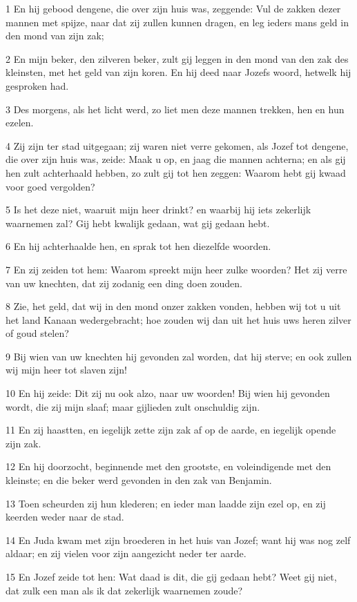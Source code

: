 \par 1 En hij gebood dengene, die over zijn huis was, zeggende: Vul de zakken dezer mannen met spijze, naar dat zij zullen kunnen dragen, en leg ieders mans geld in den mond van zijn zak;
\par 2 En mijn beker, den zilveren beker, zult gij leggen in den mond van den zak des kleinsten, met het geld van zijn koren. En hij deed naar Jozefs woord, hetwelk hij gesproken had.
\par 3 Des morgens, als het licht werd, zo liet men deze mannen trekken, hen en hun ezelen.
\par 4 Zij zijn ter stad uitgegaan; zij waren niet verre gekomen, als Jozef tot dengene, die over zijn huis was, zeide: Maak u op, en jaag die mannen achterna; en als gij hen zult achterhaald hebben, zo zult gij tot hen zeggen: Waarom hebt gij kwaad voor goed vergolden?
\par 5 Is het deze niet, waaruit mijn heer drinkt? en waarbij hij iets zekerlijk waarnemen zal? Gij hebt kwalijk gedaan, wat gij gedaan hebt.
\par 6 En hij achterhaalde hen, en sprak tot hen diezelfde woorden.
\par 7 En zij zeiden tot hem: Waarom spreekt mijn heer zulke woorden? Het zij verre van uw knechten, dat zij zodanig een ding doen zouden.
\par 8 Zie, het geld, dat wij in den mond onzer zakken vonden, hebben wij tot u uit het land Kanaan wedergebracht; hoe zouden wij dan uit het huis uws heren zilver of goud stelen?
\par 9 Bij wien van uw knechten hij gevonden zal worden, dat hij sterve; en ook zullen wij mijn heer tot slaven zijn!
\par 10 En hij zeide: Dit zij nu ook alzo, naar uw woorden! Bij wien hij gevonden wordt, die zij mijn slaaf; maar gijlieden zult onschuldig zijn.
\par 11 En zij haastten, en iegelijk zette zijn zak af op de aarde, en iegelijk opende zijn zak.
\par 12 En hij doorzocht, beginnende met den grootste, en voleindigende met den kleinste; en die beker werd gevonden in den zak van Benjamin.
\par 13 Toen scheurden zij hun klederen; en ieder man laadde zijn ezel op, en zij keerden weder naar de stad.
\par 14 En Juda kwam met zijn broederen in het huis van Jozef; want hij was nog zelf aldaar; en zij vielen voor zijn aangezicht neder ter aarde.
\par 15 En Jozef zeide tot hen: Wat daad is dit, die gij gedaan hebt? Weet gij niet, dat zulk een man als ik dat zekerlijk waarnemen zoude?
